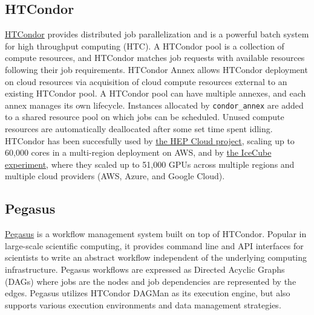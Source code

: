\subsection{HTCondor}
\href{https://research.cs.wisc.edu/htcondor}{HTCondor} \citep{Thain:2005:Condor} provides distributed job parallelization and is a powerful batch system for high throughput computing (HTC).
A HTCondor pool is a collection of compute resources, and HTCondor matches job requests with available resources following their job requirements.
HTCondor Annex allows HTCondor deployment on cloud resources via acquisition of cloud compute resources external to an existing HTCondor pool.
A HTCondor pool can have multiple annexes, and each annex manages its own lifecycle.
Instances allocated by \texttt{condor\_annex} are added to a shared resource pool on which jobs can be scheduled.
Unused compute resources are automatically deallocated after some set time spent idling.
HTCondor has been succesfully used by \href{https://aws.amazon.com/blogs/aws/experiment-that-discovered-the-higgs-boson-uses-aws-to-probe-nature}{the HEP Cloud project}, scaling up to 60,000 cores in a multi-region deployment on AWS, and by \href{https://www.linkedin.com/pulse/using-50k-gpus-across-multiple-clouds-icecube-science-igor-sfiligoi}{the IceCube experiment}, where they scaled up to 51,000 GPUs across multiple regions and multiple cloud providers (AWS, Azure, and Google Cloud).
\subsection{Pegasus}
\href{https://pegasus.isi.edu/}{Pegasus} \citep{Deelman:2015:Pegasus} is a workflow management system built on top of HTCondor.
Popular in large-scale scientific computing, it provides command line and API interfaces for scientists to write an abstract workflow independent of the underlying computing infrastructure.
Pegasus workflows are expressed as Directed Acyclic Graphs (DAGs) where jobs are the nodes and job dependencies are represented by the edges.
Pegasus utilizes HTCondor DAGMan as its execution engine, but also supports various execution environments and data management strategies.

